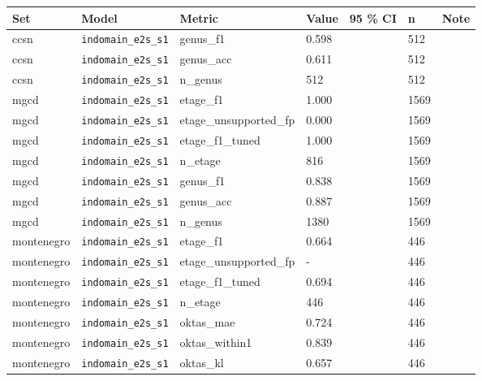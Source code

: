 \begin{center}{\scriptsize\setlength{\tabcolsep}{3pt}
\begin{tabular}{lllllll}
\toprule
Set & Model & Metric & Value & 95 \% CI & n & Note \\
\midrule
ccsn & \texttt{indomain\_\allowbreak{}e2s\_\allowbreak{}s1} & genus\_f1 & 0.598 &  & 512 &  \\
ccsn & \texttt{indomain\_\allowbreak{}e2s\_\allowbreak{}s1} & genus\_acc & 0.611 &  & 512 &  \\
ccsn & \texttt{indomain\_\allowbreak{}e2s\_\allowbreak{}s1} & n\_genus & 512 &  & 512 &  \\
mgcd & \texttt{indomain\_\allowbreak{}e2s\_\allowbreak{}s1} & etage\_f1 & 1.000 &  & 1569 &  \\
mgcd & \texttt{indomain\_\allowbreak{}e2s\_\allowbreak{}s1} & etage\_unsupported\_fp & 0.000 &  & 1569 &  \\
mgcd & \texttt{indomain\_\allowbreak{}e2s\_\allowbreak{}s1} & etage\_f1\_tuned & 1.000 &  & 1569 &  \\
mgcd & \texttt{indomain\_\allowbreak{}e2s\_\allowbreak{}s1} & n\_etage & 816 &  & 1569 &  \\
mgcd & \texttt{indomain\_\allowbreak{}e2s\_\allowbreak{}s1} & genus\_f1 & 0.838 &  & 1569 &  \\
mgcd & \texttt{indomain\_\allowbreak{}e2s\_\allowbreak{}s1} & genus\_acc & 0.887 &  & 1569 &  \\
mgcd & \texttt{indomain\_\allowbreak{}e2s\_\allowbreak{}s1} & n\_genus & 1380 &  & 1569 &  \\
montenegro & \texttt{indomain\_\allowbreak{}e2s\_\allowbreak{}s1} & etage\_f1 & 0.664 &  & 446 &  \\
montenegro & \texttt{indomain\_\allowbreak{}e2s\_\allowbreak{}s1} & etage\_unsupported\_fp & - &  & 446 &  \\
montenegro & \texttt{indomain\_\allowbreak{}e2s\_\allowbreak{}s1} & etage\_f1\_tuned & 0.694 &  & 446 &  \\
montenegro & \texttt{indomain\_\allowbreak{}e2s\_\allowbreak{}s1} & n\_etage & 446 &  & 446 &  \\
montenegro & \texttt{indomain\_\allowbreak{}e2s\_\allowbreak{}s1} & oktas\_mae & 0.724 &  & 446 &  \\
montenegro & \texttt{indomain\_\allowbreak{}e2s\_\allowbreak{}s1} & oktas\_within1 & 0.839 &  & 446 &  \\
montenegro & \texttt{indomain\_\allowbreak{}e2s\_\allowbreak{}s1} & oktas\_kl & 0.657 &  & 446 &  \\

\end{tabular}}
\end{center}
